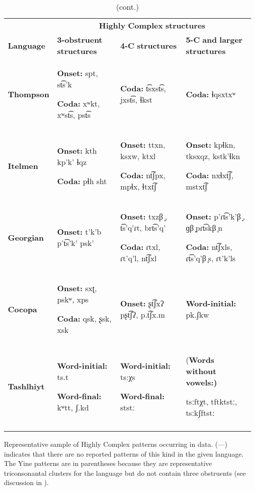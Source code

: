 \begin{table}
\begin{tabularx}{\textwidth}{XXXX}
 & \multicolumn{3}{c}{ \textbf{Highly} \textbf{Complex} \textbf{structures}}\\
\lsptoprule
\textbf{Language} & \textbf{3-obstruent} \textbf{structures} & \textbf{4-C} \textbf{structures} & \textbf{5-C} \textbf{and} \textbf{larger} \textbf{structures}\\
\textbf{Thompson} & \textbf{Onset:} spt, st͡s’k

\textbf{Coda:} xʷkt, xʷst͡s, pst͡s & \textbf{Coda:} t͡sxst͡s, jxst͡s, ɬkst & \textbf{Coda:} ɬqsxtxʷ\\
\textbf{Itelmen} & \textbf{Onset:} kth kp'k' ɬqz

\textbf{Coda:} pɬh sht & \textbf{Onset:} ttxn, ksxw, ktxl

\textbf{Coda:} nt͡ʃpx, mpɬx, ɬtxt͡ʃ & \textbf{Onset:} kpɬkn, tksxqz, kstk’ɬkn

\textbf{Coda:} nxɬxt͡ʃ, mstxt͡ʃ\\
\textbf{Georgian} & \textbf{Onset:} t'k'b p't͡s'k' psk’ & \textbf{Onset:} txzβ ̞, t͡s’q’ɾt, brt͡s'q{}'

\textbf{Coda:} ɾtxl, ɾt'q'l, nt͡ʃxl & \textbf{Onset:} p’ɾt͡s’k’β ̞, ɡβ ̞pɾt͡skβ ̞n

\textbf{Coda:} nt͡ʃxls, ɾt͡s’q’β ̞s, ɾt'k'ls\\
\textbf{Cocopa} & \textbf{Onset:} sxʈ, pskʷ, xps

\textbf{Coda:} qsk, ʂsk, xsk & \textbf{Onset:} ʂt͡ʃxʔ pʂt͡ʃʔ, p.t͡ʃx.m & \textbf{Word-initial:} pk.ʃkw\\
\textbf{Tashlhiyt} & \textbf{Word-initial:} ts.t

\textbf{Word-final:} kʷtt, ʃ.kd & \textbf{Word-initial:} ts:χs

\textbf{Word-final:} ststː & (\textbf{Words} \textbf{without} \textbf{vowels:)}

tsːftχt, tftktstː, tsːkʃftstː\\
\lspbottomrule
\end{tabularx}
{{\caption{\label{tab:key:3.12} (cont.)} Representative sample of Highly Complex patterns occurring in data. (—) indicates that there are no reported patterns of this kind in the given language. The Yine patterns are in parentheses because they are representative triconsonantal clusters for the language but do not contain three obstruents (see discussion in ).}}
\end{table}




